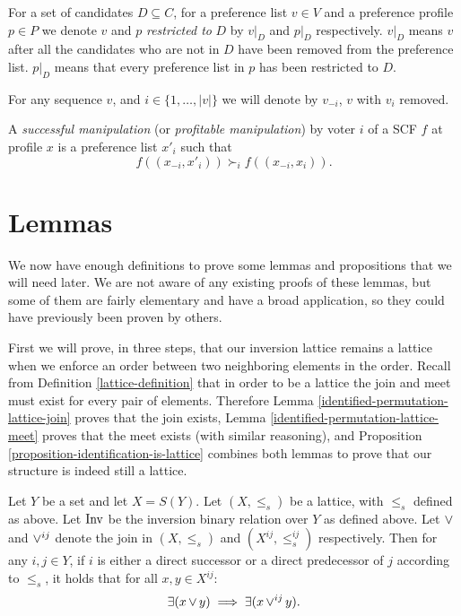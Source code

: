 	\begin{definition}
		For a set of candidates $D \subseteq C$, for a preference list $v \in V$ and a preference profile $p \in P$ we denote $v$ and $p$ \emph{restricted to} $D$ by $v|_D$ and $p|_D$ respectively. $v|_D$ means $v$ after all the candidates who are not in $D$ have been removed from the preference list. $p|_D$ means that every preference list in $p$ has been restricted to $D$.
	\end{definition}

	\begin{definition}
		For any sequence $v$, and $i \in \{1, \ldots, |v|\}$ we will denote by $v_{-i}$, $v$ with $v_i$ removed.
	\end{definition}

	\begin{definition}
		A \emph{successful manipulation} (or \emph{profitable manipulation}) by voter $i$ of a SCF $f$ at profile $x$ is a preference list $x'_i$ such that
		\[
			f((x_{-i}, x'_i)) \succ_i f((x_{-i}, x_i)).
		\]
	\end{definition}


\section{Lemmas}

	We now have enough definitions to prove some lemmas and propositions that we will need later. We are not aware of any existing proofs of these lemmas, but some of them are fairly elementary and have a broad application, so they could have previously been proven by others.

	First we will prove, in three steps, that our inversion lattice remains a lattice when we enforce an order between two neighboring elements in the order. Recall from Definition \ref{lattice-definition} that in order to be a lattice the join and meet must exist for every pair of elements. Therefore Lemma \ref{identified-permutation-lattice-join} proves that the join exists, Lemma \ref{identified-permutation-lattice-meet} proves that the meet exists (with similar reasoning), and Proposition \ref{proposition-identification-is-lattice} combines both lemmas to prove that our structure is indeed still a lattice.

	\begin{lemma}
		\label{identified-permutation-lattice-join}
		Let $Y$ be a set and let $X = S(Y)$. Let $(X, \le_s)$ be a lattice, with $\le_s$ defined as above. Let $\operatorname{Inv}$ be the inversion binary relation over $Y$ as defined above. Let $\operatorname{\vee}$ and $\operatorname{\vee}^{ij}$ denote the join in $(X, \le_s)$ and $(X^{ij}, \le^{ij}_s)$ respectively. Then for any $i,j \in Y$, if $i$ is either a direct successor or a direct predecessor of $j$ according to $\le_s$, it holds that for all $x, y \in X^{ij}$:
		\[
			\exists(x \operatorname{\vee} y) \implies \exists(x \operatorname{\vee}^{ij} y).
		\]
	\end{lemma}

